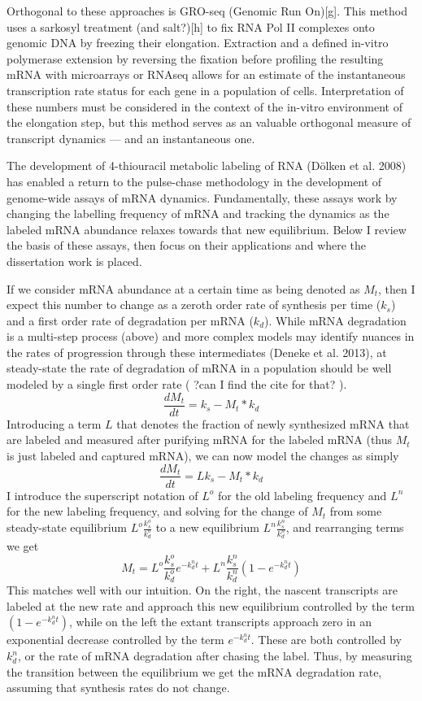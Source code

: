 Orthogonal to these approaches is GRO-seq
(Genomic Run On)[g]. This method uses a sarkosyl treatment (and
salt?)[h] to fix RNA Pol II complexes onto genomic DNA by freezing
their elongation. Extraction and a defined in-vitro polymerase
extension by reversing the fixation before profiling the resulting
mRNA with microarrays or RNAseq allows for an estimate of the
instantaneous transcription rate status for each gene in a population
of cells. Interpretation of these numbers must be considered in the
context of the in-vitro environment of the elongation step, but this
method serves as an valuable orthogonal measure of transcript dynamics
--- and an instantaneous one.  

The development of 4-thiouracil
metabolic labeling of RNA (Dölken et al. 2008) has enabled a return to
the pulse-chase methodology in the development of genome-wide assays
of mRNA dynamics. Fundamentally, these assays work by changing the
labelling frequency of mRNA and tracking the dynamics as the labeled
mRNA abundance relaxes towards that new equilibrium. Below I review
the basis of these assays, then focus on their applications and where
the dissertation work is placed.  

If we consider mRNA abundance at a
certain time as being denoted as $M_t$, then I expect this number to
change as a zeroth order rate of synthesis per time ($k_s$) and a
first order rate of degradation per mRNA ($k_d$). While mRNA
degradation is a multi-step process (above) and more complex models
may identify nuances in the rates of progression through these
intermediates (Deneke et al. 2013), at steady-state the rate of
degradation of mRNA in a population should be well modeled by a single
first order rate ( ?can I find the cite for that? ).
$$\frac{dM_t}{dt} = k_s - M_t*k_d$$ Introducing a term $L$ that
denotes the fraction of newly synthesized mRNA that are labeled and
measured after purifying mRNA for the labeled mRNA (thus $M_t$ is just
labeled and captured mRNA), we can now model the changes as simply
$$\frac{dM_t}{dt} = L k_s - M_t*k_d$$ I introduce the superscript
notation of $L^o$ for the old labeling frequency and $L^n$ for the new
labeling frequency, and solving for the change of $M_t$ from some
steady-state equilibrium $L^o \frac{k_s^o}{k_d^o}$ to a new
equilibrium $L^n \frac{k_s^n}{k_d^n}$, and rearranging terms we get
$$M_t =  L^o \frac{k_s^o}{k_d^o} e^{-k_d^n t} + L^n \frac{k_s^n}{k_d^n} ( 1- e^{-k_d^n t} )$$ 
This matches well with our
intuition. On the right, the nascent transcripts are labeled at the
new rate and approach this new equilibrium controlled by the term $(
1- e^{-k_d^n t} )$, while on the left the extant transcripts approach
zero in an exponential decrease controlled by the term $e^{-k_d^n t}$.
These are both controlled by $k_d^n$, or the rate of mRNA degradation
after chasing the label. Thus, by measuring the transition between the
equilibrium we get the mRNA degradation rate, assuming that synthesis
rates do not change.  

